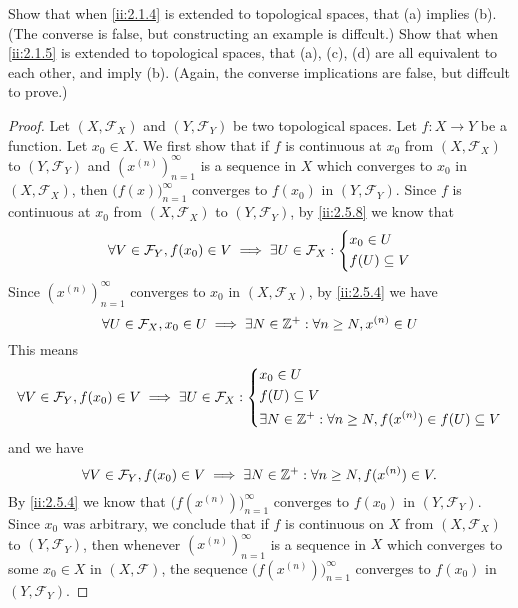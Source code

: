 \begin{ex}\label{ii:ex:2.5.16}
  Show that when \cref{ii:2.1.4} is extended to topological spaces, that (a) implies (b).
  (The converse is false, but constructing an example is diffcult.)
  Show that when \cref{ii:2.1.5} is extended to topological spaces, that (a), (c), (d) are all equivalent to each other, and imply (b).
  (Again, the converse implications are false, but diffcult to prove.)
\end{ex}

\begin{proof}
  Let \((X, \mathcal{F}_X)\) and \((Y, \mathcal{F}_Y)\) be two topological spaces.
  Let \(f : X \to Y\) be a function.
  Let \(x_0 \in X\).
  We first show that if \(f\) is continuous at \(x_0\) from \((X, \mathcal{F}_X)\) to \((Y, \mathcal{F}_Y)\) and \((x^{(n)})_{n = 1}^\infty\) is a sequence in \(X\) which converges to \(x_0\) in \((X, \mathcal{F}_X)\), then \(\big(f(x)\big)_{n = 1}^\infty\) converges to \(f(x_0)\) in \((Y, \mathcal{F}_Y)\).
  Since \(f\) is continuous at \(x_0\) from \((X, \mathcal{F}_X)\) to \((Y, \mathcal{F}_Y)\), by \cref{ii:2.5.8} we know that
  \[
    \forall V \in \mathcal{F}_Y, f(x_0) \in V \implies \exists U \in \mathcal{F}_X : \begin{dcases}
      x_0 \in U \\
      f(U) \subseteq V
    \end{dcases}
  \]
  Since \((x^{(n)})_{n = 1}^\infty\) converges to \(x_0\) in \((X, \mathcal{F}_X)\), by \cref{ii:2.5.4} we have
  \[
    \forall U \in \mathcal{F}_X, x_0 \in U \implies \exists N \in \mathbb{Z}^+ : \forall n \geq N, x^{(n)} \in U
  \]
  This means
  \[
    \forall V \in \mathcal{F}_Y, f(x_0) \in V \implies \exists U \in \mathcal{F}_X : \begin{dcases}
      x_0 \in U        \\
      f(U) \subseteq V \\
      \exists N \in \mathbb{Z}^+ : \forall n \geq N, f(x^{(n)}) \in f(U) \subseteq V
    \end{dcases}
  \]
  and we have
  \[
    \forall V \in \mathcal{F}_Y, f(x_0) \in V \implies \exists N \in \mathbb{Z}^+ : \forall n \geq N, f(x^{(n)}) \in V.
  \]
  By \cref{ii:2.5.4} we know that \(\big(f(x^{(n)})\big)_{n = 1}^\infty\) converges to \(f(x_0)\) in \((Y, \mathcal{F}_Y)\).
  Since \(x_0\) was arbitrary, we conclude that if \(f\) is continuous on \(X\) from \((X, \mathcal{F}_X)\) to \((Y, \mathcal{F}_Y)\), then whenever \((x^{(n)})_{n = 1}^\infty\) is a sequence in \(X\) which converges to some \(x_0 \in X\) in \((X, \mathcal{F})\), the sequence \(\big(f(x^{(n)})\big)_{n = 1}^\infty\) converges to \(f(x_0)\) in \((Y, \mathcal{F}_Y)\).


\end{proof}
